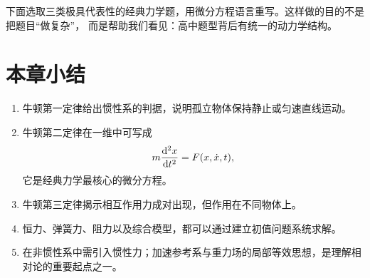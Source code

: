 下面选取三类极具代表性的经典力学题，用微分方程语言重写。这样做的目的不是把题目“做复杂”，
而是帮助我们看见：高中题型背后有统一的动力学结构。

\section*{本章小结}

\begin{enumerate}
  \item 牛顿第一定律给出惯性系的判据，说明孤立物体保持静止或匀速直线运动。
  \item 牛顿第二定律在一维中可写成
  \[
    m\dv[2]{x}{t}=F(x,\dot{x},t),
  \]
  它是经典力学最核心的微分方程。
  \item 牛顿第三定律揭示相互作用力成对出现，但作用在不同物体上。
  \item 恒力、弹簧力、阻力以及综合模型，都可以通过建立初值问题系统求解。
  \item 在非惯性系中需引入惯性力；加速参考系与重力场的局部等效思想，是理解相对论的重要起点之一。
\end{enumerate}


